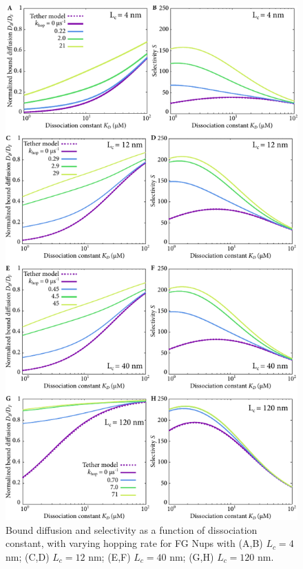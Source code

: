 \begin{figure}
\centering
\includegraphics[width=0.7\linewidth]{figs/ch02/all_hopping_results.pdf}
\caption[Effect of Nup contour length and hopping rate on selectivity.]{Bound diffusion and selectivity as a function of dissociation
  constant, with varying hopping rate for FG Nups with (A,B) $L_c = 4$ nm; (C,D) $L_c = 12$ nm; (E,F) $L_c = 40$ nm; (G,H) $L_c = 120$ nm.}
\label{fig:hop-results}
\end{figure}

